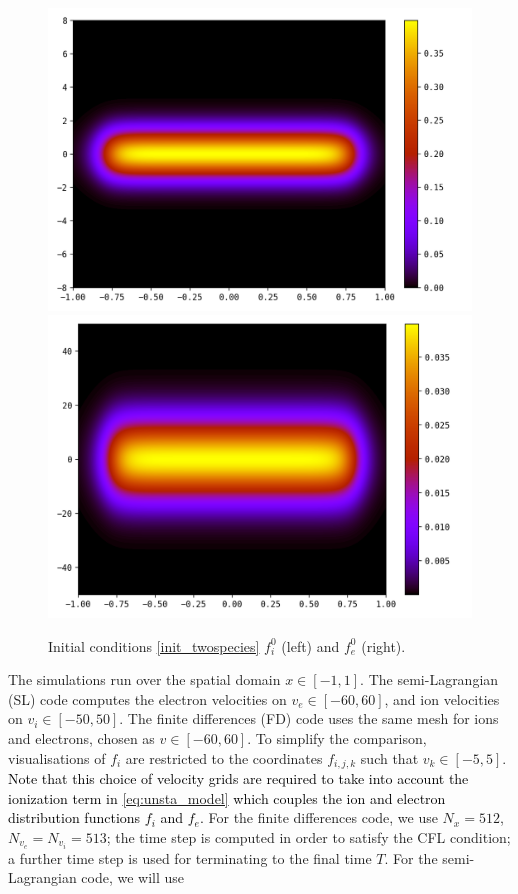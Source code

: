 \documentclass{article}
\numberwithin{equation}{section}
\newcommand{\imh}{\textheight} %
\begin{document}
\begin{figure}
	\centering
	\renewcommand{\imh}{0.33\linewidth}
	\includegraphics[height=\imh]{images/fi_init}
	\includegraphics[height=\imh]{images/fe_init}
	\caption{Initial conditions \eqref{init_twospecies} $f_i^0$ (left) and $f_e^0$ (right).}
	\label{fig:init_cond}
\end{figure}

The simulations run over the spatial domain $x \in [-1,1]$. The semi-Lagrangian (SL) code computes the electron velocities on $v_e \in [-60, 60]$, and ion velocities on $v_i \in [-50, 50]$. The finite differences (FD) code uses the same mesh for ions and electrons, chosen as $v\in[-60,60]$. To simplify the comparison, visualisations of $f_i$ are restricted to the coordinates $f_{i,j,k}$ such that $v_k \in [-5,5]$. \textcolor{black}{Note that 
this choice of velocity grids are required to take into account the ionization term in \eqref{eq:unsta_model} which couples the ion and electron 
distribution functions $f_i$ and $f_e$. }
For the finite differences code, we use $N_x=512$, $N_{v_e}=N_{v_i}=513$; the time step is computed in order to satisfy the CFL condition; a further time step is used for terminating to the final time $T$.  
For the semi-Lagrangian code, we will use
\end{document}
